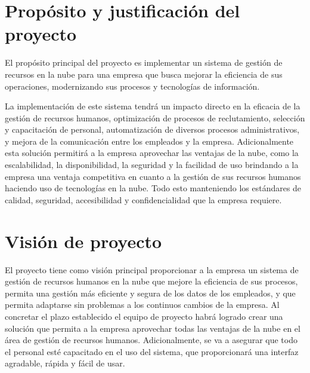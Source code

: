   \pagestyle{empty}
  
  \portada

  \newpage

  \pagestyle{empty}

  \sectionfont{\color{darkblue}\normalfont\Large\bfseries}
  
  \tableofcontents

  \newpage

  \pagestyle{main}

  \sectionfont{\color{darkblue}\normalfont\Large\bfseries}
  \subsectionfont{\color{lightblue}\normalfont\large\bfseries}
  \subsubsectionfont{\color{lightred}\normalfont\large\itshape}

  
  \section{Propósito y justificación del proyecto}
  El propósito principal del proyecto es implementar un sistema de gestión de recursos en la nube para una empresa que busca mejorar la eficiencia de sus operaciones, modernizando sus procesos y tecnologías de información.

  La implementación de este sistema tendrá un impacto directo en la eficacia de la gestión de recursos humanos, optimización de procesos de reclutamiento, selección y capacitación de personal, automatización de diversos procesos administrativos, y mejora de la comunicación entre los empleados y la empresa. Adicionalmente esta solución permitirá a la empresa aprovechar las ventajas de la nube, como la escalabilidad, la disponibilidad, la seguridad y la facilidad de uso brindando a la empresa una ventaja competitiva en cuanto a la gestión de sus recursos humanos haciendo uso de tecnologías en la nube. Todo esto manteniendo los estándares de calidad, seguridad, accesibilidad y confidencialidad que la empresa requiere.

  \section{Visión de proyecto}
  El proyecto tiene como visión principal proporcionar a la empresa un sistema de gestión de recursos humanos en la nube que mejore la eficiencia de sus procesos, permita una gestión más eficiente y segura de los datos de los empleados, y que permita adaptarse sin problemas a los continuos cambios de la empresa. Al concretar el plazo establecido el equipo de proyecto habrá logrado crear una solución que permita a la empresa aprovechar todas las ventajas de la nube en el área de gestión de recursos humanos. Adicionalmente, se va a asegurar que todo el personal esté capacitado en el uso del sistema, que proporcionará una interfaz agradable, rápida y fácil de usar.

